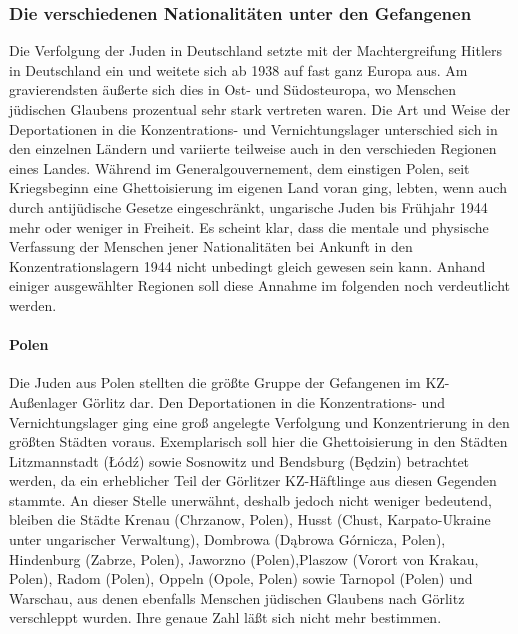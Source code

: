 \subsubsection{Die verschiedenen Nationalitäten unter den Gefangenen}
Die Verfolgung der Juden in Deutschland setzte mit der Machtergreifung Hitlers in Deutschland ein und weitete sich ab 1938 auf fast ganz Europa aus. Am gravierendsten äußerte sich dies in Ost- und Südosteuropa, wo Menschen jüdischen Glaubens prozentual sehr stark vertreten waren. Die Art und Weise der Deportationen in die Konzentrations- und Vernichtungslager unterschied sich in den einzelnen Ländern und variierte teilweise auch in den verschieden Regionen eines Landes.
Während im Generalgouvernement, dem einstigen Polen, seit Kriegsbeginn eine Ghettoisierung im eigenen Land voran ging, lebten, wenn auch durch antijüdische Gesetze eingeschränkt, ungarische Juden bis Frühjahr 1944 mehr oder weniger in Freiheit.
Es scheint klar, dass die mentale und physische Verfassung der Menschen jener Nationalitäten bei Ankunft in den Konzentrationslagern 1944 nicht unbedingt gleich gewesen sein kann. Anhand einiger ausgewählter Regionen soll diese Annahme im folgenden noch verdeutlicht werden.




\paragraph{Polen}
Die Juden aus Polen stellten die größte Gruppe der Gefangenen im KZ-Außenlager Görlitz dar. Den Deportationen in die Konzentrations- und Vernichtungslager ging eine groß angelegte Verfolgung und Konzentrierung in den größten Städten voraus. Exemplarisch soll hier die Ghettoisierung in den Städten Litzmannstadt (\L \'od\'z) sowie Sosnowitz und Bendsburg (Będzin) betrachtet werden, da ein erheblicher Teil der Görlitzer KZ-Häftlinge aus diesen Gegenden stammte. An dieser Stelle unerwähnt, deshalb jedoch nicht weniger bedeutend, bleiben die Städte Krenau (Chrzanow, Polen), Husst (Chust, Karpato-Ukraine unter ungarischer Verwaltung), Dombrowa (Dąbrowa Górnicza, Polen), Hindenburg (Zabrze, Polen), Jaworzno (Polen),Plaszow (Vorort von Krakau, Polen), Radom (Polen), Oppeln (Opole, Polen) sowie Tarnopol (Polen) und Warschau, aus denen ebenfalls Menschen jüdischen Glaubens nach Görlitz verschleppt wurden. Ihre genaue Zahl läßt sich nicht mehr bestimmen.


